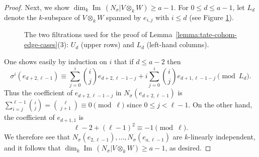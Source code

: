 \documentclass[reqno]{amsart}
\numberwithin{equation}{subsection}
\DeclareMathOperator{\Ima}{Im\,}
\theoremstyle{remark}
\numberwithin{equation}{subsection}
\numberwithin{figure}{subsection}
\begin{document}
\begin{proof}
Next, we show $\dim_k \Ima(N_\sigma|V \otimes_k W) \geq a-1$. For $0 \leq d \leq a-1$, let $L_d$ denote the $k$-subspace of $V \otimes_k W$ spanned by $e_{i,j}$ with $i \leq d$ (see Figure \ref{fig:Ud-Ld}).

\begin{figure}[!h]
\centering
{}
\caption{The two filtrations used for the proof of Lemma~\ref{lemma:tate-cohom-edge-cases}(3): $U_d$ (upper rows) and $L_d$ (left-hand columns).}
\label{fig:Ud-Ld}
\end{figure}

One shows easily by induction on $i$ that if $d \leq a-2$ then
\[
\sigma^i(e_{d+2, \ell-1}) \equiv \sum_{j=0}^i {i\choose j} e_{d+2,\ell-1-j} + i\sum_{j=0}^i {i\choose j}e_{d+1,\ell-1-j} \pmod{L_d}.
\]
Thus the coefficient of $e_{d+2,\ell-1-j}$ in $N_\sigma(e_{d+2,\ell-1})$ is $\sum_{i=j}^{\ell-1} {i\choose j} = {\ell \choose j+1} \equiv 0 \pmod{\ell}$ since $0 \leq j < \ell-1$. On the other hand, the coefficient of $e_{d+1,1}$ is
\[
\ell - 2 + (\ell-1)^2 \equiv -1 \pmod{\ell}.
\]
We therefore see that $N_\sigma(e_{2,\ell-1}), \dots, N_\sigma(e_{a,\ell-1})$ are $k$-linearly independent, and it follows that $\dim_k \Ima(N_\sigma|V \otimes_k W) \geq a-1$, as desired.
\end{proof}
\end{document}
